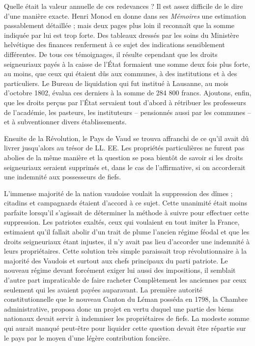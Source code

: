 \documentclass[french,twoside]{book} %
\begin{document}
Quelle était la valeur annuelle de ces redevances ? Il est assez difficile de le dire d’une manière exacte. Henri Monod en donne dans ses \emph{Mémoires} une estimation passablement détaillée ; mais deux pages plus loin il reconnaît que la somme indiquée par lui est trop forte. Des tableaux dressés par les soins du Ministère helvétique des finances renferment à ce sujet des indications sensiblement différentes. De tous ces témoignages, il résulte cependant que les droits seigneuriaux payés à la caisse de l’État formaient une somme deux fois plus forte, au moins, que ceux qui étaient dûs aux communes, à des institutions et à des particuliers. Le Bureau de liquidation qui fut institué à Lausanne, au mois d’octobre 1802, évalua ces derniers à la somme de 284 800 francs. Ajoutons, enfin, que les droits perçus par l’État servaient tout d’abord à rétribuer les professeurs de l’académie, les pasteurs, les instituteurs – pensionnés aussi par les communes – et à subventionner divers établissements.\par
Ensuite de la Révolution, le Pays de Vaud se trouva affranchi de ce qu’il avait dû livrer jusqu’alors au trésor de LL. EE. Les propriétés particulières ne furent pas abolies de la même manière et la question se posa bientôt de savoir si les droits seigneuriaux seraient supprimés et, dans le cas de l’affirmative, si on accorderait une indemnité aux possesseurs de fiefs.\par
L’immense majorité de la nation vaudoise voulait la suppression des dîmes ; citadins et campagnards étaient d’accord à ce sujet. Cette unanimité était moins parfaite lorsqu’il s’agissait de déterminer la méthode à suivre pour effectuer cette suppression. Les patriotes exaltés, ceux qui voulaient en tout imiter la France, estimaient qu’il fallait abolir d’un trait de plume l’ancien régime féodal et que les droits seigneuriaux étant injustes, il n’y avait pas lieu d’accorder une indemnité à leurs propriétaires. Cette solution très simple paraissait trop révolutionnaire à la majorité des Vaudois et surtout aux chefs principaux du parti patriote. Le nouveau régime devant forcément exiger lui aussi des impositions, il semblait d’autre part impraticable de faire racheter Complètement les anciennes par ceux seulement qui les avaient payées auparavant. La première autorité constitutionnelle que le nouveau Canton du Léman posséda en 1798, la Chambre administrative, proposa donc un projet en vertu duquel une partie des biens nationaux devait servir à indemniser les propriétaires de fiefs. La modeste somme qui aurait manqué peut-être pour liquider cette question devait être répartie sur le pays par le moyen d’une légère contribution foncière.\par
\end{document}
